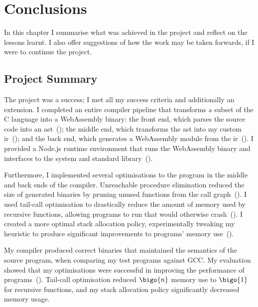 \documentclass[00-main.tex]{subfiles}
\begin{document}
\chapter{Conclusions}

In this chapter I summarise what was achieved in the project and reflect on the lessons learnt.
I also offer suggestions of how the work may be taken forwards, if I were to continue the project.

\section{Project Summary}

The project was a success; I met all my success criteria and additionally an extension.
I completed an entire compiler pipeline that transforms a subset of the C language into a WebAssembly binary: the front end, which parses the source code into an \gls{ast}~(); the middle end, which transforms the \gls{ast} into my custom \gls{ir}~(); and the back end, which generates a WebAssembly module from the \gls{ir}~().
I provided a Node.js runtime environment that runs the WebAssembly binary and interfaces to the system and standard library~().

Furthermore, I implemented several optimisations to the program in the middle and back ends of the compiler.
Unreachable procedure elimination reduced the size of generated binaries by pruning unused functions from the call graph~().
I used tail-call optimisation to drastically reduce the amount of memory used by recursive functions, allowing programs to run that would otherwise crash~().
I created a more optimal stack allocation policy, experimentally tweaking my heuristic to produce significant improvements to programs' memory use~().

My compiler produced correct binaries that maintained the semantics of the source program, when comparing my test programs against GCC\@.
My evaluation showed that my optimisations were successful in improving the performance of programs~().
Tail-call optimisation reduced $\bigo{n}$ memory use to $\bigo{1}$ for recursive functions, and my stack allocation policy significantly decreased memory usage.
\end{document}

